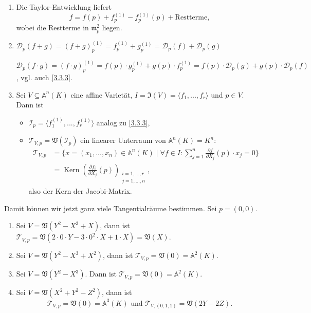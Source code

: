 \documentclass[a4paper,12pt,index=toc]{scrbook}
\theoremstyle{keinenummern} %
\def\A{\mathbb{A}}
\def\V{\mathfrak{V}}
\def\I{\mathfrak{I}}
\def\II{\mathcal{I}}
\newcommand{\DD}{\mathcal{D}} %
\def\T{\mathcal{T}}
\def\m{\mathfrak{m}}
\newcommand{\Kern}{\operatorname{Kern}}
\let\olddotsc\dotsc %
\renewcommand{\dotsc}{\ensuremath{\!...}}
\begin{document}
\begin{bem}\label{3.3.4}
\begin{enumerate}
\item{} Die Taylor-Entwicklung liefert
\begin{equation*}f=f(p)+f_{p}^{(1)}-f_{p}^{(1)}(p)+\text{Restterme},\end{equation*}
wobei die Restterme in $\m_{p}^{2}$ liegen.
\item{} $\DD_{p}(f+g)=(f+g)_{p}^{(1)}=f_{p}^{(1)}+g_{p}^{(1)}=\DD_{p}(f)+\DD_{p}(g)$

$\DD_{p}(f\cdot g)=(f\cdot g)_{p}^{(1)}=f(p)\cdot g_{p}^{(1)}+g(p)\cdot f_{p}^{(1)}=f(p)\cdot \DD_{p}(g)+g(p)\cdot\DD_{p}(f)$, vgl. auch \cref{3.3.3}.
\item{} Sei $V\subseteq\A^{n}(K)$ eine affine Varietät, $I=\I(V)=\langle f_{1},\dotsc,f_{r}\rangle$ und $p\in V$. Dann ist
\begin{itemize}
\item $\II_{p}=\langle f_{1}^{(1)},\dotsc,f_{r}^{(1)}\rangle$ analog zu \cref{3.3.3},
\item $\T_{V,p}=\V(\II_{p})$ ein linearer Unterraum von $\A^{n}(K)=K^{n}$:
\begin{align*}\T_{V,p}&=\{x=(x_{1},\dotsc,x_{n})\in\A^{n}(K)\mid \forall f\in I:\sum_{j=1}^{n}\frac{\partial f}{\partial X_{j}}(p)\cdot x_{j}=0\}\\
&=\Kern\left(\frac{\partial f_{i}}{\partial X_{j}}(p)\right)_{\substack{i=1,\olddotsc,r\\ j=1,\olddotsc,n}},\end{align*}
also der Kern der Jacobi-Matrix.
\end{itemize}
\end{enumerate}\end{bem}

\begin{bsp}\label{3.3.5}
Damit können wir jetzt ganz viele Tangentialräume bestimmen. Sei $p=(0,0)$.
\begin{enumerate}
\item Sei $V=\V(Y^{2}-X^{3}+X)$, dann ist $\T_{V,p}=\V(2\cdot 0\cdot Y - 3\cdot 0^{2}\cdot X + 1\cdot X)=\V(X)$.
\item Sei $V=\V(Y^{2}-X^{3}+X^{2})$, dann ist $\T_{V,p}=\V(0)=\A^{2}(K)$.
\item Sei $V=\V(Y^{2}-X^{3})$. Dann ist $\T_{V,p}=\V(0)=\A^{2}(K)$.
\item Sei $V=\V(X^{2}+Y^{2}-Z^{2})$, dann ist 
\begin{equation*}\T_{V,p}=\V(0)=\A^{3}(K)\text{ und }\T_{V,(0,1,1)}=\V(2Y-2Z).\end{equation*}
\end{enumerate}\end{bsp}
\end{document}
